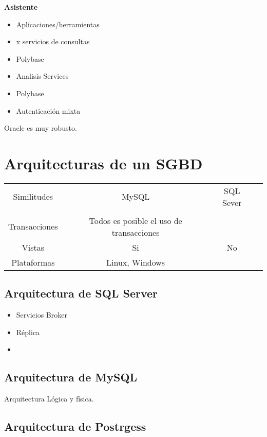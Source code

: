 \documentclass{article}
\begin{document}
\vspace{1em}
\textbf{Asistente}

\begin{itemize}
	\item
		Aplicaciones/herramientas
	\item
		x servicios de consultas
	\item
		Polybase
	\item
		Analisis Services
	\item
		Polybase
	\item
		Autenticación mixta
\end{itemize}

\noindent\makebox[\linewidth]{\rule{\paperwidth}{2.0pt}}

\vspace{1em}
Oracle es muy robusto.

\section{Arquitecturas de un SGBD}

\begin{tabular}{ c | c | c | c |}
   Similitudes & MySQL & SQL Sever \\ \\
	Transacciones & Todos es posible el uso de transacciones\\
	Vistas & Si & No &\\
	Plataformas & Linux, Windows &  &\\
 \end{tabular}

\subsection{Arquitectura de SQL Server}
\begin{itemize}
	\item
		Servicios Broker
	\item
		Réplica
	\item
\end{itemize}

\subsection{Arquitectura de MySQL}
Arquitectura Lógica y física.

\subsection{Arquitectura de Postrgess}
\end{document}
